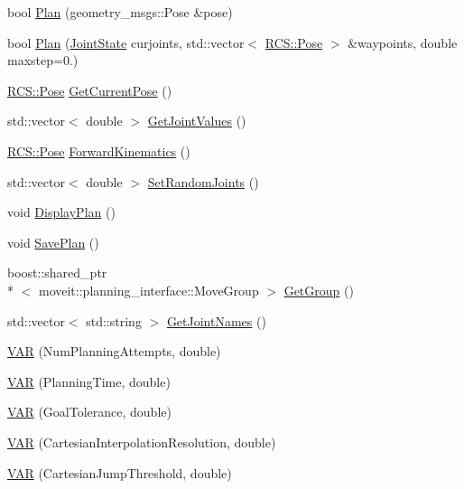 \begin{DoxyCompactItemize}
\item 
bool \hyperlink{classMoveitPlanning_ac0e53ee15cf0ac2f605422534963d78e}{Plan} (geometry\-\_\-msgs\-::\-Pose \&pose)
\item 
bool \hyperlink{classMoveitPlanning_a89a6cc30c32514b8382f1a31868a32d4}{Plan} (\hyperlink{RCS_8h_aa4adb93a26caa4dacba9c9614e283245}{Joint\-State} curjoints, std\-::vector$<$ \hyperlink{namespaceRCS_aa07e45d8a50e30064283d2b38087f999}{R\-C\-S\-::\-Pose} $>$ \&waypoints, double maxstep=0.)
\item 
\hyperlink{namespaceRCS_aa07e45d8a50e30064283d2b38087f999}{R\-C\-S\-::\-Pose} \hyperlink{classMoveitPlanning_a44786615bc6798f29575d5846078c881}{Get\-Current\-Pose} ()
\item 
std\-::vector$<$ double $>$ \hyperlink{classMoveitPlanning_a4ad173a662340daf91ab2ddde44e0946}{Get\-Joint\-Values} ()
\item 
\hyperlink{namespaceRCS_aa07e45d8a50e30064283d2b38087f999}{R\-C\-S\-::\-Pose} \hyperlink{classMoveitPlanning_a9eb93f8c0456c80bd07ebc57e5c90d32}{Forward\-Kinematics} ()
\item 
std\-::vector$<$ double $>$ \hyperlink{classMoveitPlanning_a8e98e6c54141fc0a3ef92cfcef7bcfa5}{Set\-Random\-Joints} ()
\item 
void \hyperlink{classMoveitPlanning_abe8bbc034b09c7935ee2a54d557fb5c8}{Display\-Plan} ()
\item 
void \hyperlink{classMoveitPlanning_a99ae8ab8c7047f95d114701f1f3f2a49}{Save\-Plan} ()
\item 
boost\-::shared\-\_\-ptr\\*
$<$ moveit\-::planning\-\_\-interface\-::\-Move\-Group $>$ \hyperlink{classMoveitPlanning_ae8754bf6b519a2fc6ada11a44989479b}{Get\-Group} ()
\item 
std\-::vector$<$ std\-::string $>$ \hyperlink{classMoveitPlanning_a26149b824c249979b28fcb46d4909668}{Get\-Joint\-Names} ()
\item 
\hyperlink{classMoveitPlanning_a16acdb968a79729866f33aa51035aa17}{V\-A\-R} (Num\-Planning\-Attempts, double)
\item 
\hyperlink{classMoveitPlanning_ab89c04762fec4567601f1f9e3518d9b7}{V\-A\-R} (Planning\-Time, double)
\item 
\hyperlink{classMoveitPlanning_ad373c539d0caa8defff124c0bdfafebf}{V\-A\-R} (Goal\-Tolerance, double)
\item 
\hyperlink{classMoveitPlanning_ad3ff47e0cb727e46074122505a2b1e0a}{V\-A\-R} (Cartesian\-Interpolation\-Resolution, double)
\item 
\hyperlink{classMoveitPlanning_aebedee2a63d3a034b784acc6bb46d55f}{V\-A\-R} (Cartesian\-Jump\-Threshold, double)
\end{DoxyCompactItemize}
